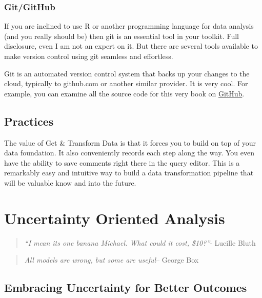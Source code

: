 \documentclass[]{book}
\begin{document}
\hypertarget{gitgithub}{%
\subsection{Git/GitHub}\label{gitgithub}}

If you are inclined to use R or another programming language for data analysis (and you really should be) then git is an essential tool in your toolkit. Full disclosure, even I am not an expert on it. But there are several tools available to make version control using git seamless and effortless.

Git is an automated version control system that backs up your changes to the cloud, typically to github.com or another similar provider. It is very cool. For example, you can examine all the source code for this very book on \href{https://github.com/nemethc/dataisfordemocracy/tree/master/doingdemocraticdataanalysis}{GitHub}.

\hypertarget{practices-1}{%
\section{Practices}\label{practices-1}}

The value of Get \& Transform Data is that it forces you to build on top of your data foundation. It also conveniently records each step along the way. You even have the ability to save comments right there in the query editor. This is a remarkably easy and intuitive way to build a data transformation pipeline that will be valuable know and into the future.

\hypertarget{uncertainty-oriented-analysis}{%
\chapter{Uncertainty Oriented Analysis}\label{uncertainty-oriented-analysis}}

\begin{quote}
\emph{``I mean its one banana Michael. What could it cost, \$10?''}- Lucille Bluth
\end{quote}

\begin{quote}
\emph{All models are wrong, but some are useful}-- George Box
\end{quote}

\hypertarget{embracing-uncertainty-for-better-outcomes}{%
\section{Embracing Uncertainty for Better Outcomes}\label{embracing-uncertainty-for-better-outcomes}}
\end{document}
